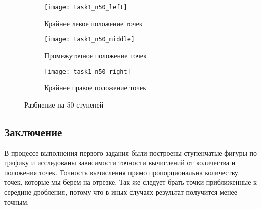 \begin{figure}[H]
	\centering
	\begin{subfigure}{0.3\textwidth}
		\centering
		\texttt{[image: task1\_n50\_left]}\quad
		\caption*{Крайнее левое положение точек}
	\end{subfigure}
	\begin{subfigure}{0.3\textwidth}
		\centering
		\texttt{[image: task1\_n50\_middle]}\quad
		\caption*{Промежуточное положение точек}
	\end{subfigure}
	\begin{subfigure}{0.3\textwidth}
		\centering
		\texttt{[image: task1\_n50\_right]}\quad
		\caption*{Крайнее правое положение точек}
	\end{subfigure}
	\caption{Разбиение на 50 ступеней}
\end{figure}
\subsection*{Заключение}
В процессе выполнения первого задания были построены ступенчатые фигуры по графику и исследованы зависимости точности вычислений от количества и положения точек. Точность вычисления прямо пропорциональна количеству точек, которые мы берем на отрезке. Так же следует брать точки приближенные к середине дробления, потому что в иных случаях результат получится менее точным.

